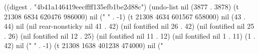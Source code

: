
((digest . "4b41a146419eecffff135efb1be2d88c") (undo-list nil (3877 . 3878) (t 21308 6834 620476 986000) nil ("          %
" . -1) (t 21308 4634 601567 658000) nil (43 . 44) nil (nil rear-nonsticky nil 41 . 42) (nil fontified nil 26 . 42) (nil fontified nil 25 . 26) (nil fontified nil 12 . 25) (nil fontified nil 11 . 12) (nil fontified nil 1 . 11) (1 . 42) nil ("%
" . -1) (t 21308 1638 401238 474000) nil ("%

